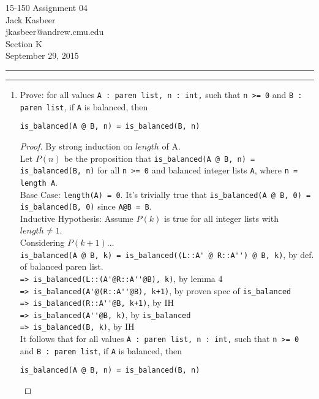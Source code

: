 \documentclass[11pt]{article}
\makeatletter
\newcommand{\question}[2] {\vspace{.25in} \hrule\vspace{0.5em}
\noindent{\bf #1: #2} \vspace{0.5em}
\hrule \vspace{.10in}}
\newcommand{\myname}{Jack Kasbeer}
\newcommand{\myandrew}{jkasbeer@andrew.cmu.edu}
\newcommand{\myhwnum}{04}
\makeatother
\begin{document}
\medskip            
\thispagestyle{plain}
\begin{center} 
{\Large 15-150 Assignment \myhwnum} \\
\myname \\
\myandrew \\
Section K \\
September 29, 2015 \\
\end{center}

\question{2}{Parentheses Matching}
\begin{enumerate}
\item Prove: for all values \verb|A : paren list, n : int,| such that \verb|n >= 0| and \verb|B : paren list|, if \verb|A| is balanced, then 
\begin{center} \verb|is_balanced(A @ B, n) = is_balanced(B, n)| \end{center}
\begin{proof}
By strong induction on $length$ of A.\\
Let $P(n)$ be the proposition that \verb|is_balanced(A @ B, n) = is_balanced(B, n)| for all \verb|n >= 0| and balanced integer lists \verb|A|, where \verb|n = length A|.\\
Base Case: \verb|length(A) = 0|.  It's trivially true that \verb|is_balanced(A @ B, 0) = is_balanced(B, 0)| since \verb|A@B = B|.\\
Inductive Hypothesis: Assume $P(k)$ is true for all integer lists with $length \neq 1$.\\
Considering $P(k+1)$...\\
\verb|is_balanced(A @ B, k) = is_balanced((L::A' @ R::A'') @ B, k)|, by def. of balanced paren list.\\
\verb|=> is_balanced(L::(A'@R::A''@B), k)|, by lemma 4\\
\verb|=> is_balanced(A'@(R::A''@B), k+1)|, by proven spec of \verb|is_balanced|\\
\verb|=> is_balanced(R::A''@B, k+1)|, by IH\\
\verb|=> is_balanced(A''@B, k)|, by \verb|is_balanced|\\
\verb|=> is_balanced(B, k)|, by IH\\
It follows that for all values \verb|A : paren list, n : int,| such that \verb|n >= 0| and \verb|B : paren list|, if \verb|A| is balanced, then 
\begin{center} \verb|is_balanced(A @ B, n) = is_balanced(B, n)| \end{center} 
\end{proof}

\end{enumerate}
\end{document}
